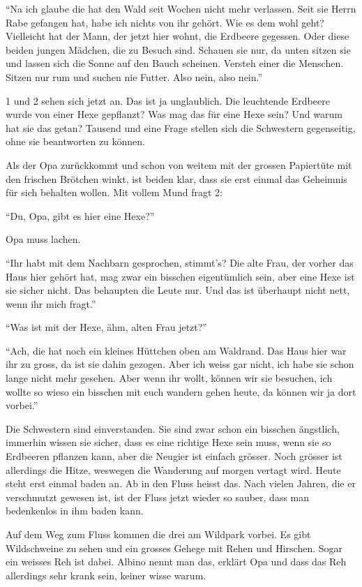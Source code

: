 \begin{mdframed}[style=mystyle]
\enquote{Na ich glaube die hat den Wald seit Wochen nicht mehr verlassen. Seit sie Herrn Rabe gefangen hat, habe ich nichts von ihr gehört. Wie es dem wohl geht? Vielleicht hat der Mann, der jetzt hier wohnt, die Erdbeere gegessen. Oder diese beiden jungen Mädchen, die zu Besuch sind. Schauen sie nur, da unten sitzen sie und lassen sich die Sonne auf den Bauch scheinen. Versteh einer die Menschen. Sitzen nur rum und suchen nie Futter. Also nein, also nein.}

1 und 2 sehen sich jetzt an. Das ist ja unglaublich. Die leuchtende Erdbeere wurde von einer Hexe gepflanzt? Was mag das für eine Hexe sein? Und warum hat sie das getan? Tausend und eine Frage stellen sich die Schwestern gegenseitig, ohne sie beantworten zu können.

Als der Opa zurückkommt und schon von weitem mit der grossen Papiertüte mit den frischen Brötchen winkt, ist beiden klar, dass sie erst einmal das Geheimnis für sich behalten wollen. Mit vollem Mund fragt 2:

\enquote{Du, Opa, gibt es hier eine Hexe?}

Opa muss lachen.

\enquote{Ihr habt mit dem Nachbarn gesprochen, stimmt's? Die alte Frau, der vorher das Haus hier gehört hat, mag zwar ein bisschen eigentümlich sein, aber eine Hexe ist sie sicher nicht. Das behaupten die Leute nur. Und das ist überhaupt nicht nett, wenn ihr mich fragt.}

\enquote{Was ist mit der Hexe, ähm, alten Frau jetzt?}

\enquote{Ach, die hat noch ein kleines Hüttchen oben am Waldrand. Das Haus hier war ihr zu gross, da ist sie dahin gezogen. Aber ich weiss gar nicht, ich habe sie schon lange nicht mehr gesehen. Aber wenn ihr wollt, können wir sie besuchen, ich wollte so wieso ein bisschen mit euch wandern gehen heute, da können wir ja dort vorbei.}

Die Schwestern sind einverstanden. Sie sind zwar schon ein bisschen ängstlich, immerhin wissen sie sicher, dass es eine richtige Hexe sein muss, wenn sie so Erdbeeren pflanzen kann, aber die Neugier ist einfach grösser. Noch grösser ist allerdings die Hitze, weswegen die Wanderung auf morgen vertagt wird. Heute steht erst einmal baden an. Ab in den Fluss heisst das. Nach vielen Jahren, die er verschmutzt gewesen ist, ist der Fluss jetzt wieder so sauber, dass man bedenkenlos in ihm baden kann.

Auf dem Weg zum Fluss kommen die drei am Wildpark vorbei. Es gibt Wildschweine zu sehen und ein grosses Gehege mit Rehen und Hirschen. Sogar ein weisses Reh ist dabei. Albino nennt man das, erklärt Opa und dass das Reh allerdings sehr krank sein, keiner wisse warum.


\end{mdframed}
